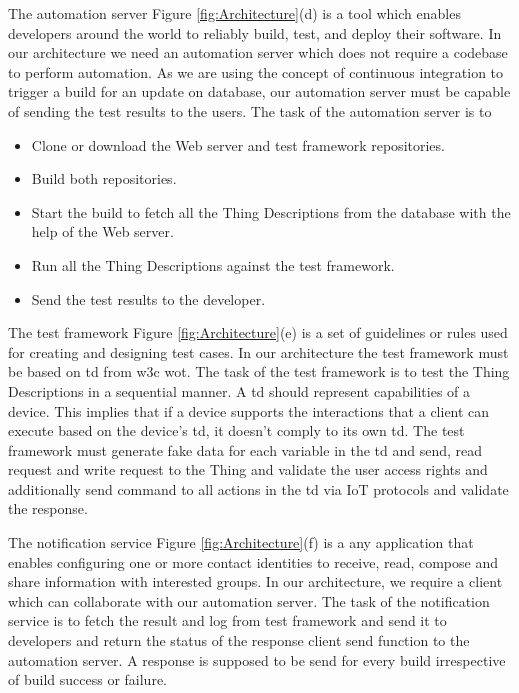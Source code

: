 \documentclass[conference]{IEEEtran}
\theoremstyle{definition}
\begin{document}
The automation server Figure \ref{fig:Architecture}(d) is a tool which enables developers around the world to reliably build, test, and deploy their software. 
In our architecture we need an automation server which does not require a codebase to perform automation. 
As we are using the concept of continuous integration to trigger a build for an update on database, our automation server must be capable of sending the test results to the users. 
The task of the automation server is to 
\begin{itemize}
  \item Clone or download the Web server and test framework repositories.
  \item Build both repositories.
  \item Start the build to fetch all the Thing Descriptions from the database with the help of the Web server.
  \item Run all the Thing Descriptions against the test framework.
  \item Send the test results to the developer.
\end{itemize}

The test framework Figure \ref{fig:Architecture}(e) is a set of guidelines or rules used for creating and designing test cases. 
In our architecture the test framework must be based on \ac{td} from \ac{w3c} \ac{wot}. 
The task of the test framework is to test the Thing Descriptions in a sequential manner. 
A \ac{td} should represent capabilities of a device. 
This implies that if a device supports the interactions that a client can execute based on the device's \ac{td}, it doesn't comply to its own \ac{td}. 
The test framework must generate fake data for each variable in the \ac{td} and send, read request and write request to the Thing and validate the user access rights and additionally send command to all actions in the \ac{td} via IoT protocols and validate the response. 

The notification service Figure \ref{fig:Architecture}(f) is a any application that enables configuring one or more contact identities to receive, read, compose and share information with interested groups. 
In our architecture, we require a client which can collaborate with our automation server. 
The task of the notification service is to fetch the result and log from test framework and send it to developers and return the status of the response client send function to the automation server. 
A response is supposed to be send for every build irrespective of build success or failure.
\end{document}
